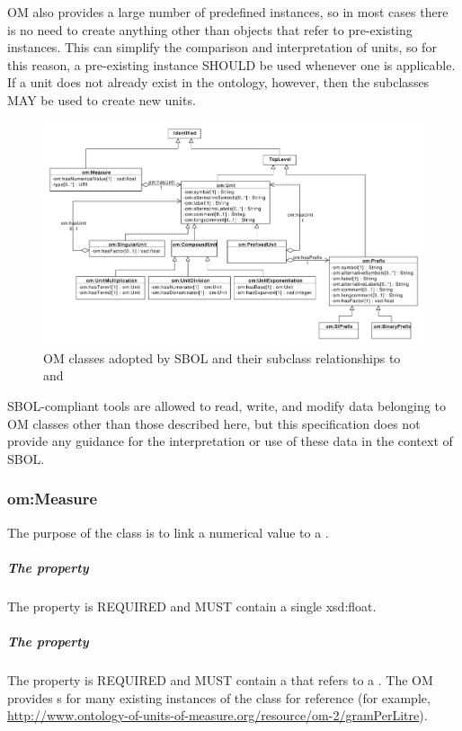 OM also provides a large number of predefined  instances, so in most cases there is no need to create anything other than  objects that refer to pre-existing instances.
This can simplify the comparison and interpretation of units, so for this reason, a pre-existing  instance SHOULD be used whenever one is applicable.
If a unit does not already exist in the ontology, however, then the  subclasses MAY be used to create new units.


\begin{figure}[ht]
\begin{center}
\includegraphics[width=\linewidth]{uml/om}
\caption[]{OM classes adopted by SBOL and their subclass relationships to  and }
\label{uml:om}
\end{center}
\end{figure}

SBOL-compliant tools are allowed to read, write, and modify data belonging to OM classes other than those described here, but this specification does not provide any guidance for the interpretation or use of these data in the context of SBOL.

\subsubsection{om:Measure} \label{sec:om:Measure}

The purpose of the  class is to link a numerical value to a . 

\subparagraph{The  property}\label{sec:om:hasNumericalValue}
The  property is REQUIRED and MUST contain a single xsd:float.

\subparagraph{The  property}\label{sec:om:hasUnit:Measure}
The  property is REQUIRED and MUST contain a  that refers to a . The OM provides s for many existing instances of the  class for reference (for example,\\ \url{http://www.ontology-of-units-of-measure.org/resource/om-2/gramPerLitre}).

